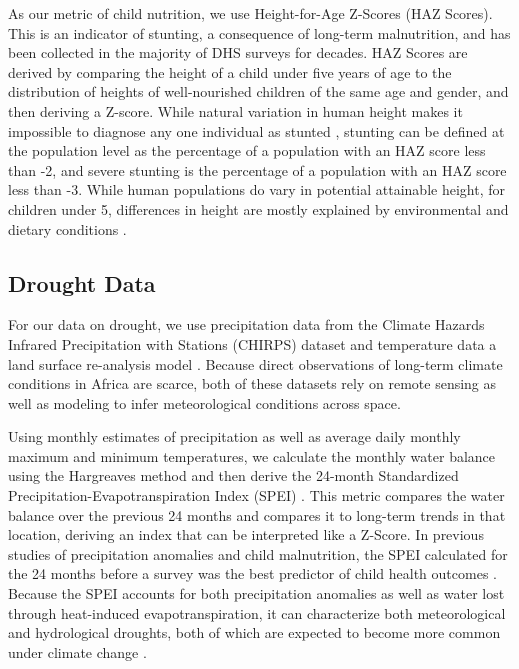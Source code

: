 \documentclass{article}
\begin{document}
As our metric of child nutrition, we use Height-for-Age Z-Scores (HAZ Scores).  This is an indicator of stunting, a consequence of long-term malnutrition, and has been collected in the majority of DHS surveys for decades.  HAZ Scores are derived by comparing the height of a child under five years of age to the distribution of heights of well-nourished children of the same age and gender, and then deriving a Z-score.  While natural variation in human height makes it impossible to diagnose any one individual as stunted \cite{Perumal2018}, stunting can be defined at the population level as the percentage of a population with an HAZ score less than -2, and severe stunting is the percentage of a population with an HAZ score less than -3.  While human populations do vary in potential attainable height, for children under 5, differences in height are mostly explained by environmental and dietary conditions \cite{Habicht1974}.

\subsection{Drought Data}
For our data on drought, we use precipitation data from the Climate Hazards Infrared Precipitation with Stations (CHIRPS) dataset \cite{Funk2015} and temperature data a land surface re-analysis model \cite{Sheffield2006}.  Because direct observations of long-term climate conditions in Africa are scarce, both of these datasets rely on remote sensing as well as modeling to infer meteorological conditions across space.

Using monthly estimates of precipitation as well as average daily monthly maximum and minimum temperatures, we calculate the monthly water balance using the Hargreaves method \cite{Hargreaves1982} and then derive the 24-month Standardized Precipitation-Evapotranspiration Index (SPEI) \cite{Begueria2014}.  This metric compares the water balance over the previous 24 months and compares it to long-term trends in that location, deriving an index that can be interpreted like a Z-Score.  In previous studies of precipitation anomalies and child malnutrition, the SPEI calculated for the 24 months before a survey was the best predictor of child health outcomes \cite{Cooper2019Mapping}.  Because the SPEI accounts for both precipitation anomalies as well as water lost through heat-induced evapotranspiration, it can characterize both meteorological and hydrological droughts, both of which are expected to become more common under climate change \cite{Dai2013}.
\end{document}
